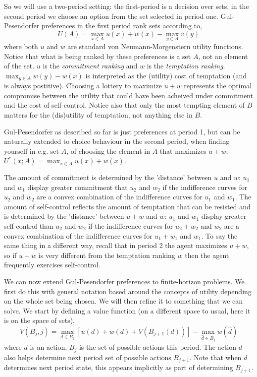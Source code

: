So we will use a two-period setting: the first-period is a decision over sets, in the second period we choose an option from the set selected in period one. Gul-Pesendorfer preferences in the first period rank sets according to,
\begin{equation*}
 U(A)=\max_{x \in A} u(x)+w(x)-\max_{y\in A} v(y)
\end{equation*}
where both $u$ and $w$ are standard von Neumann-Morgenstern utility functions. Notice that what is being ranked by these preferences is a set $A$, not an element of the set. $u$ is the \textit{commitment ranking} and $w$ is the \textit{temptation ranking}. $\max_{y\in A} w(y) -w(x)$ is interpreted as the (utility) cost of temptation (and is always postitive). Choosing a lottery to maximize $u+w$ represents the optimal compromise between the utility that could have been acheived under commitment and the cost of self-control. Notice also that only the most tempting element of $B$ matters for the (dis)utility of temptation, not anything else in $B$.

Gul-Pesendorfer as described so far is just preferences at period 1, but can be naturally extended to choice behaviour in the second period, when finding yourself in e.g. set $A$, of choosing the element in $A$ that maximizes $u+w$; $U^{*}(x; A)=\max_{x \in A} u(x)+w(x)$.

The amount of commitment is determined by the 'distance' between $u$ and $w$: $u_1$ and $w_1$ display greater commitment that $u_2$ and $w_2$ if the indifference curves for $u_2$ and $w_2$ are a convex combination of the indifference curves for $u_1$ and $w_1$. The amount of self-control reflects the amount of temptation that can be resisted and is determined by the 'distance' between $u+w$ and $w$: $u_1$ and $w_1$ display greater self-control than $u_2$ and $w_2$ if the indifference curves for $u_2+w_2$ and $w_2$ are a convex combination of the indifference curves for $u_1+w_1$ and $w_1$. To say the same thing in a different way, recall that in period 2 the agent maximizes $u+w$, so if $u+w$ is very different from the temptation ranking $w$ then the agent frequently exercises self-control.

We can now extend Gul-Pesendorfer preferences to finite-horizon problems. We first do this with general notation based around the concepts of utility depending on the whole set being chosen. We will then refine it to something that we can solve. We start by defining a value function (on a different space to usual, here it is on the space of sets),
\begin{equation*}
 V(B_j, j) = \max_{d \in B_j} [ u(d) + w(d) + V(B_{j+1}(d))] - \max_{\hat{d} \in B_j} w(\hat{d})
\end{equation*}
where $d$ is an action, $B_j$ is the set of possible actions this period. The action $d$ also helps determine next period set of possible actions $B_{j+1}$. Note that when $d$ determines next period state, this appears implicitly as part of determining $B_{j+1}$.

